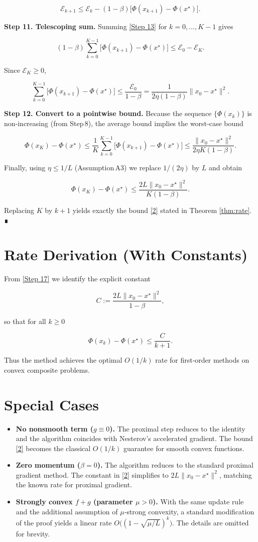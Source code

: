 \documentclass{article}
\begin{document}
\[
\mathcal{E}_{k+1}
\le \mathcal{E}_k - (1-\beta)\bigl[\Phi(x_{k+1})-\Phi(x^\star)\bigr].
\tag{Step 13}
\]

\noindent\textbf{Step 11.  Telescoping sum.}  
Summing \eqref{Step 13} for $k=0,\dots, K-1$ gives  

\[
(1-\beta)\sum_{k=0}^{K-1}\bigl[\Phi(x_{k+1})-\Phi(x^\star)\bigr]
\le \mathcal{E}_0-\mathcal{E}_{K}.
\tag{Step 14}
\]

Since $\mathcal{E}_K\ge0$,  

\[
\sum_{k=0}^{K-1}\bigl[\Phi(x_{k+1})-\Phi(x^\star)\bigr]
\le \frac{\mathcal{E}_0}{1-\beta}
= \frac{1}{2\eta(1-\beta)}\|x_0-x^\star\|^{2}.
\tag{Step 15}
\]

\noindent\textbf{Step 12.  Convert to a pointwise bound.}  
Because the sequence $\{\Phi(x_k)\}$ is non‑increasing (from Step 8), the average bound implies the worst‑case bound

\[
\Phi(x_K)-\Phi(x^\star)
\le \frac{1}{K}\sum_{k=0}^{K-1}\bigl[\Phi(x_{k+1})-\Phi(x^\star)\bigr]
\le \frac{\|x_0-x^\star\|^{2}}{2\eta K(1-\beta)}.
\tag{Step 16}
\]

Finally, using $\eta\le 1/L$ (Assumption A3) we replace $1/(2\eta)$ by $L$ and obtain

\[
\Phi(x_K)-\Phi(x^\star)\le \frac{2L\|x_0-x^\star\|^{2}}{K(1-\beta)}.
\tag{Step 17}
\]

Replacing $K$ by $k+1$ yields exactly the bound \eqref{2} stated in Theorem \ref{thm:rate}. ∎

\section*{Rate Derivation (With Constants)}
From \eqref{Step 17} we identify the explicit constant  

\[
C:=\frac{2L\|x_0-x^\star\|^{2}}{1-\beta},
\]

so that for all $k\ge0$

\[
\Phi(x_k)-\Phi(x^\star)\le \frac{C}{k+1}.
\]

Thus the method achieves the optimal $O(1/k)$ rate for first‑order methods on convex composite problems.

\section*{Special Cases}
\begin{itemize}
\item \textbf{No nonsmooth term ($g\equiv0$).}  
  The proximal step reduces to the identity and the algorithm coincides with Nesterov’s accelerated gradient. The bound \eqref{2} becomes the classical $O(1/k)$ guarantee for smooth convex functions.
\item \textbf{Zero momentum ($\beta=0$).}  
  The algorithm reduces to the standard proximal gradient method. The constant in \eqref{2} simplifies to $2L\|x_0-x^\star\|^{2}$, matching the known rate for proximal gradient.
\item \textbf{Strongly convex $f+g$ (parameter $\mu>0$).}  
  With the same update rule and the additional assumption of $\mu$‑strong convexity, a standard modification of the proof yields a linear rate $O\bigl((1-\sqrt{\mu/L})^{k}\bigr)$. The details are omitted for brevity.
\end{itemize}
\end{document}
